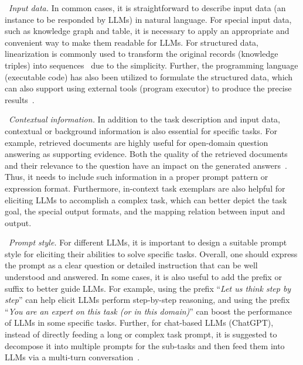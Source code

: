 \textbullet~\emph{Input data.} 
In common cases, it is straightforward to describe input data (\eg an instance to be responded by LLMs) in natural language. 
For special input data, such as knowledge graph and table, it is necessary to {apply an appropriate and convenient way} %
to make them readable for LLMs.  %
For structured data, linearization is commonly used to transform the original records (\eg knowledge triples) into sequences~\cite{Jiang-2023-arxiv-StructGPT} due to the simplicity.  
Further, the programming language (\eg executable code) has also been utilized to formulate the structured data,  %
{which can also support using external tools (\eg program executor) to produce the precise results~\cite{Beurer-arxiv-2023-Prompting,Lu-arxiv-2023-Chameleon}.
}



\textbullet~\emph{Contextual information.}
In addition to the task description and input data, contextual or background information is also essential for specific tasks. For example, retrieved documents are highly useful for open-domain question answering as supporting evidence. Both the quality of the retrieved documents and their relevance to the question have an impact on the generated answers~\cite{Ren-arxiv-2023-Investigating}. 
Thus, it needs to include such information in a proper prompt pattern or expression format.
Furthermore, in-context task exemplars are also helpful for eliciting LLMs to accomplish a complex task, which can better depict the task goal, {the special output formats, and the mapping relation between input and output.}

 
\textbullet~\emph{{Prompt} style.}
For different LLMs, it is important to design a suitable prompt style for eliciting their abilities to solve specific tasks. 
Overall, one should express the prompt as a clear question or detailed instruction that can be well understood and  answered. 
In some cases, it is also useful to add the {prefix or suffix} to better guide LLMs.
For example, using the prefix ``\emph{Let us think step by step}'' can help elicit LLMs perform step-by-step reasoning, and using the prefix ``\emph{You are an expert on this task (or in this domain)}'' can boost the performance of LLMs in some specific tasks. 
Further, 
for chat-based LLMs (\eg ChatGPT), instead of directly feeding a long or complex task prompt, it is suggested to decompose it into multiple prompts for the sub-tasks and then feed them into LLMs via a multi-turn conversation~\cite{Chen-2023-arXiv-chatcot}.


